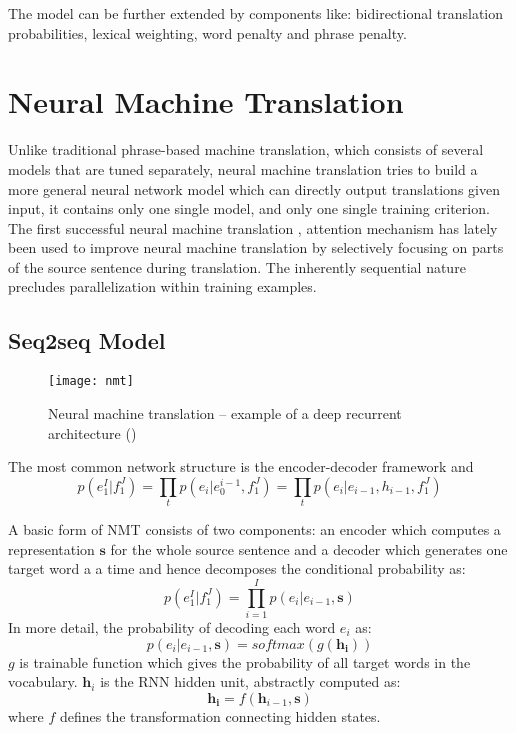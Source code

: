 The model can be further extended by components like: bidirectional translation probabilities, lexical weighting, word penalty and phrase penalty. 


\section{Neural Machine Translation}
Unlike traditional phrase-based machine translation, which consists of several models that are tuned separately, neural machine translation tries to build a more general neural network model which can directly output translations given input, it contains only one single model, and only one single training criterion. \\
The first successful neural machine translation , attention mechanism has lately been used to improve neural machine translation by selectively focusing on parts of the source sentence during translation. The inherently sequential nature precludes parallelization within training examples.



\subsection{Seq2seq Model}
\begin{figure}[t]
	\texttt{[image: nmt]}
	\caption{ Neural machine translation – example of a deep recurrent architecture (\cite{luong2015effective})}
	\centering
\end{figure}

The most common network structure is the encoder-decoder framework and 
\[ p(e_1^I | f_1^J) = \prod_{t} p(e_i|e_0^{i-1}, f_1^J) = \prod_{t} {p(e_i| e_{i-1}, h_{i-1}, f_1^J)} \] 


A basic form of NMT consists of two components: an encoder which computes a representation $\bm{s}$ for the whole source sentence and a decoder which generates one target word a a time and hence decomposes the conditional probability as:
\[ p(e_1^I|f_1^J) = \prod_{i=1}^{I} p(e_i| e_{i-1}, \bm{s})  \]
In more detail, the probability of decoding each word $e_i$ as:
\[ p(e_i|e_{i-1}, \bm{s}) = softmax(g(\bm{h_i}))\]
$g$ is trainable function which gives the probability of all target words in the vocabulary. 
$\bm{h}_i$ is the RNN hidden unit, abstractly computed as:
\[ \bm{h_i} = f(\bm{h}_{i-1}, \bm{s})\]
where $f$ defines the transformation connecting hidden states.  








